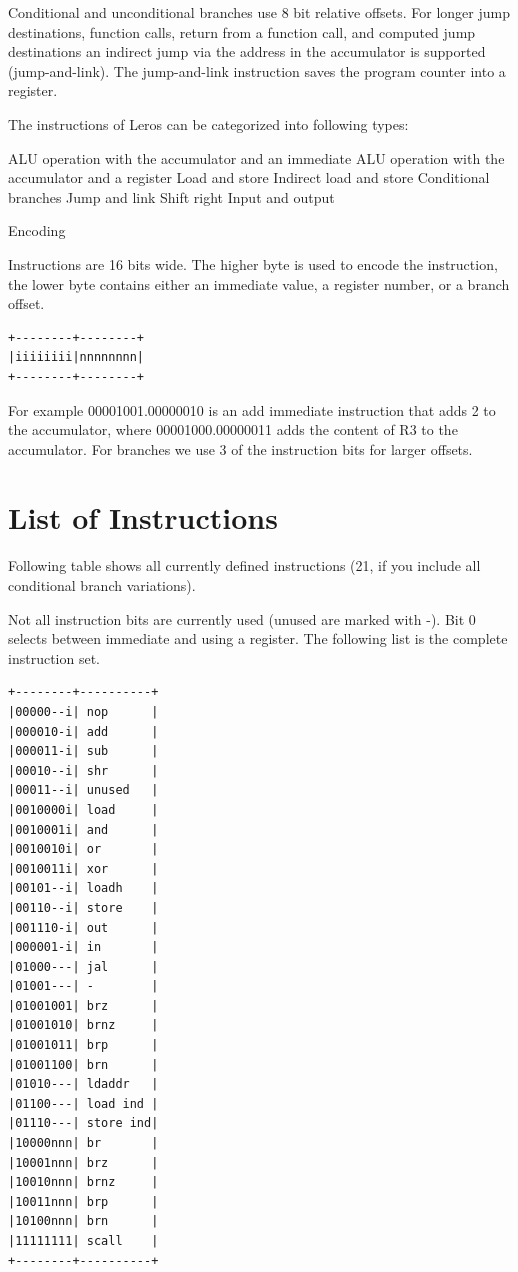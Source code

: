 \documentclass[a4paper,fontsize=10pt,twoside,DIV15,BCOR12mm,headinclude=true,footinclude=false,pagesize,bibtotoc]{scrbook}
\begin{document}
Conditional and unconditional branches use 8 bit relative offsets.
For longer jump destinations, function calls, return from a function call, and computed jump
destinations an indirect jump via the address in the accumulator is supported (jump-and-link).
The jump-and-link instruction saves the program counter into a register.


The instructions of Leros can be categorized into following types:

    ALU operation with the accumulator and an immediate
    ALU operation with the accumulator and a register
    Load and store
    Indirect load and store
    Conditional branches
    Jump and link
    Shift right
    Input and output

Encoding

Instructions are 16 bits wide. The higher byte is used to encode the instruction, the lower byte contains either an immediate value, a register number, or a branch offset.

\begin{verbatim}
+--------+--------+
|iiiiiiii|nnnnnnnn|
+--------+--------+
\end{verbatim}



For example 00001001.00000010 is an add immediate instruction that adds 2 to the accumulator, where 00001000.00000011 adds the content of R3 to the accumulator. For branches we use 3 of the instruction bits
for larger offsets.

\section{List of Instructions}

Following table shows all currently defined instructions (21, if you include all conditional branch variations).

Not all instruction bits are currently used (unused are marked with -). Bit 0 selects between immediate and using a register. The following list is the complete instruction set.

\begin{verbatim}
+--------+----------+
|00000--i| nop      |
|000010-i| add      |
|000011-i| sub      |
|00010--i| shr      |
|00011--i| unused   |
|0010000i| load     |
|0010001i| and      |
|0010010i| or       |
|0010011i| xor      |
|00101--i| loadh    |
|00110--i| store    |
|001110-i| out      |
|000001-i| in       |
|01000---| jal      |
|01001---| -        |
|01001001| brz      |
|01001010| brnz     |
|01001011| brp      |
|01001100| brn      |
|01010---| ldaddr   |
|01100---| load ind |
|01110---| store ind|
|10000nnn| br       |
|10001nnn| brz      |
|10010nnn| brnz     |
|10011nnn| brp      |
|10100nnn| brn      |
|11111111| scall    |
+--------+----------+
\end{verbatim}
\end{document}
